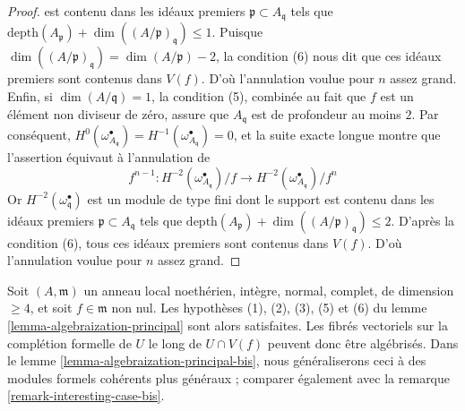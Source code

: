 \begin{proof}
est contenu dans les idéaux premiers $\mathfrak p \subset A_\mathfrak q$ tels que
$\text{depth}(A_\mathfrak p) + \dim((A/\mathfrak p)_\mathfrak q) \leq 1$.
Puisque $\dim((A/\mathfrak p)_\mathfrak q) = \dim(A/\mathfrak p) - 2$,
la condition (6) nous dit que ces idéaux premiers sont contenus dans $V(f)$.
D'où l'annulation voulue pour $n$ assez grand.
Enfin, si $\dim(A/\mathfrak q) = 1$, la condition (5), combinée
au fait que $f$ est un élément non diviseur de zéro,
assure que $A_\mathfrak q$ est de profondeur au moins $2$. Par conséquent,
$H^0(\omega_{A_\mathfrak q}^\bullet) =
H^{-1}(\omega_{A_\mathfrak q}^\bullet) = 0$,
et la suite exacte longue montre que l'assertion
équivaut à l'annulation de
$$
f^{n - 1} :
H^{-2}(\omega_{A_\mathfrak q}^\bullet)/f \to
H^{-2}(\omega_{A_\mathfrak q}^\bullet)/f^n
$$
Or $H^{-2}(\omega^\bullet_\mathfrak q)$ est un module de type fini dont le support
est contenu dans les idéaux premiers $\mathfrak p \subset A_\mathfrak q$
tels que $\text{depth}(A_\mathfrak p) + \dim((A/\mathfrak p)_\mathfrak q)
\leq 2$. D'après la condition (6), tous ces idéaux premiers sont contenus dans $V(f)$.
D'où l'annulation voulue pour $n$ assez grand.
\end{proof}

\begin{remark}
\label{remark-interesting-case}
Soit $(A, \mathfrak m)$ un anneau local noethérien, intègre, normal, complet,
de dimension $\geq 4$, et soit $f \in \mathfrak m$ non nul.
Les hypothèses (1), (2), (3), (5) et (6) du
lemme \ref{lemma-algebraization-principal}
sont alors satisfaites. Les fibrés vectoriels
sur la complétion formelle de $U$ le long de $U \cap V(f)$
peuvent donc être algébrisés. Dans le lemme \ref{lemma-algebraization-principal-bis},
nous généraliserons ceci à des modules formels cohérents plus généraux ;
comparer également avec la remarque \ref{remark-interesting-case-bis}.
\end{remark}

